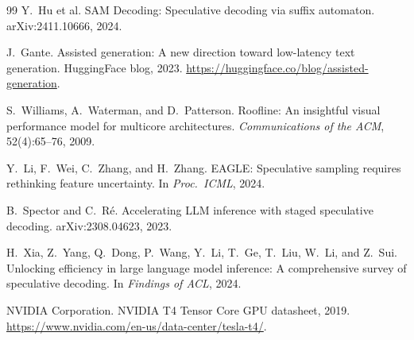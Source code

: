 \documentclass[letterpaper,twocolumn,10pt]{article}
\begin{document}
{\begin{thebibliography}{99}
Y.~Hu et al.
SAM Decoding: Speculative decoding via suffix automaton.
arXiv:2411.10666, 2024.

J.~Gante.
Assisted generation: A new direction toward low-latency text generation.
HuggingFace blog, 2023.
\url{https://huggingface.co/blog/assisted-generation}.

S.~Williams, A.~Waterman, and D.~Patterson.
Roofline: An insightful visual performance model for multicore architectures.
\emph{Communications of the ACM}, 52(4):65--76, 2009.

Y.~Li, F.~Wei, C.~Zhang, and H.~Zhang.
EAGLE: Speculative sampling requires rethinking feature uncertainty.
In \emph{Proc.\ ICML}, 2024.

B.~Spector and C.~R\'e.
Accelerating LLM inference with staged speculative decoding.
arXiv:2308.04623, 2023.

H.~Xia, Z.~Yang, Q.~Dong, P.~Wang, Y.~Li, T.~Ge, T.~Liu, W.~Li, and Z.~Sui.
Unlocking efficiency in large language model inference: A comprehensive survey of speculative decoding.
In \emph{Findings of ACL}, 2024.

NVIDIA Corporation.
NVIDIA T4 Tensor Core GPU datasheet, 2019.
\url{https://www.nvidia.com/en-us/data-center/tesla-t4/}.

\end{thebibliography}
}
\end{document}
